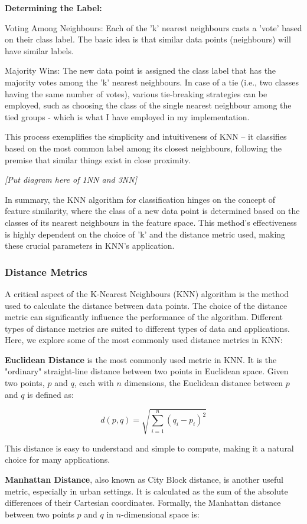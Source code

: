 \documentclass[letterpaper,10pt]{article}
\begin{document}
\textbf{Determining the Label:}

Voting Among Neighbours: Each of the 'k' nearest neighbours casts a 'vote' based on their class label. The basic idea is that similar data points (neighbours) will have similar labels.

Majority Wins: The new data point is assigned the class label that has the majority votes among the 'k' nearest neighbours. In case of a tie (i.e., two classes having the same number of votes), various tie-breaking strategies can be employed, such as choosing the class of the single nearest neighbour among the tied groups - which is what I have employed in my implementation.

This process exemplifies the simplicity and intuitiveness of KNN – it classifies based on the most common label among its closest neighbours, following the premise that similar things exist in close proximity.

\textit{[Put diagram here of 1NN and 3NN]}

In summary, the KNN algorithm for classification hinges on the concept of feature similarity, where the class of a new data point is determined based on the classes of its nearest neighbours in the feature space. This method's effectiveness is highly dependent on the choice of 'k' and the distance metric used, making these crucial parameters in KNN's application.


\subsubsection{Distance Metrics}
A critical aspect of the K-Nearest Neighbours (KNN) algorithm is the method used to calculate the distance between data points. The choice of the distance metric can significantly influence the performance of the algorithm. Different types of distance metrics are suited to different types of data and applications. Here, we explore some of the most commonly used distance metrics in KNN: \par

\textbf{Euclidean Distance} is the most commonly used metric in KNN. It is the "ordinary" straight-line distance between two points in Euclidean space. Given two points, \(p\) and \(q\), each with \(n\) dimensions, the Euclidean distance between \(p\) and \(q\) is defined as:

\[ d(p,q) = \sqrt{\sum_{i=1}^{n} (q_i - p_i)^2} \]

This distance is easy to understand and simple to compute, making it a natural choice for many applications. \par
\vspace{5pt}
\textbf{Manhattan Distance}, also known as City Block distance, is another useful metric, especially in urban settings. It is calculated as the sum of the absolute differences of their Cartesian coordinates. Formally, the Manhattan distance between two points \(p\) and \(q\) in \(n\)-dimensional space is:
\end{document}
